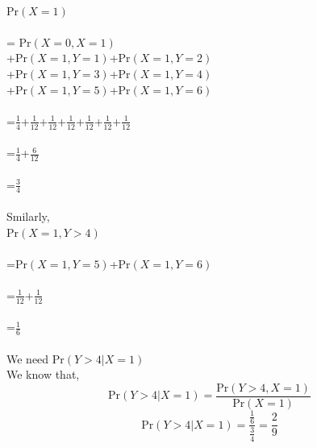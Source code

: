 \documentclass[journal,12pt,twocolumn]{IEEEtran}
\begin{document}
\\
Pr$(X=1)$\\\\
= Pr$(X=0,X=1)$\\
+Pr$(X=1,Y=1)$+Pr$(X=1,Y=2)$\\
+Pr$(X=1,Y=3)$+Pr$(X=1,Y=4)$\\
+Pr$(X=1,Y=5)$+Pr$(X=1,Y=6)$ \\\\
=$\frac{1}{4}$+$\frac{1}{12}$+$\frac{1}{12}$+$\frac{1}{12}$+$\frac{1}{12}$+$\frac{1}{12}$+$\frac{1}{12}$\\\\
=$\frac{1}{4}$+$\frac{6}{12}$\\\\
=$\frac{3}{4}$\\\\
Smilarly,\\
Pr$(X=1,Y>4)$\\\\
=Pr$(X=1,Y=5)$+Pr$(X=1,Y=6)$\\\\
=$\frac{1}{12}$+$\frac{1}{12}$\\\\
=$\frac{1}{6}$\\\\
We need Pr$(Y>4|X=1)$\\
We know that,
\begin{equation}
   \text{Pr}(Y>4|X=1)= \frac{\text{Pr}(Y>4,X=1)}{\text{Pr}(X=1)} 
\end{equation}
\begin{equation}
  \text{Pr}(Y>4|X=1)= \frac{\frac{1}{6}}{\frac{3}{4}}=\frac{2}{9}
\end{equation}
\therefore {} \\\\
\end{document}
